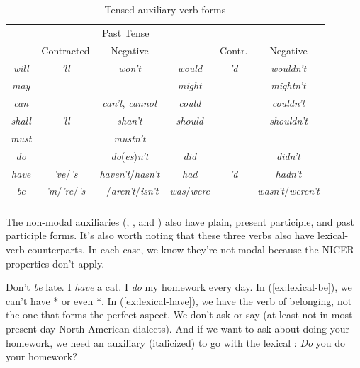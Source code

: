 \begin{table}
    \begin{tabular}{cccccc}
        \lsptoprule
        \multicolumn{3}{c}{Present Tense} & \multicolumn{3}{c}{Past Tense} \\
         & Contracted & Negative &  & Contr. & Negative \\
        \midrule
        \textit{will} & \textit{'ll} & \textit{won't} & \textit{would} & \textit{'d} & \textit{wouldn't} \\ 
        \textit{may} & & & \textit{might} & & \textit{mightn't} \\ 
        \textit{can} & & \textit{can't}, \textit{cannot} & \textit{could} & & \textit{couldn't} \\ 
        \textit{shall} & \textit{'ll} & \textit{shan't} & \textit{should} & & \textit{shouldn't} \\ 
        \textit{must} & & \textit{mustn't} & & & \\
        \textit{do} & &\textit{do}(\textit{es})\textit{n't} & \textit{did} && \textit{didn't} \\ 
        \textit{have} & \textit{'ve}/\textit{'s} & \textit{haven't}/\textit{hasn't} & \textit{had} & \textit{'d} & \textit{hadn't} \\ 
        \textit{be} & \textit{'m}/\textit{'re}/\textit{'s} & \textit{--}/\textit{aren't}/\textit{isn't} & \textit{was}/\textit{were} & & \textit{wasn't}/\textit{weren't} \\
        \lspbottomrule
    \end{tabular}
    \caption{Tensed auxiliary verb forms}
    \label{tab:modal-auxiliary-forms}
\end{table}

\noindent The non-modal auxiliaries (, , and ) also have plain, present participle, and past participle forms. It's also worth noting that these three verbs also have lexical-verb counterparts. In each case, we know they're not modal because the NICER properties don't apply.

\ea
\ea Don't \emph{be} late.\label{ex:lexical-be}
\ex I \emph{have} a cat.\label{ex:lexical-have}
\ex I \emph{do} my homework every day.\label{ex:lexical-do}
\z\z
In (\ref{ex:lexical-be}), we can't have * or even *. In (\ref{ex:lexical-have}), we have the verb of belonging, not the one that forms the perfect aspect. We don't ask  or say  (at least not in most present-day North American dialects). And if we want to ask about doing your homework, we need an auxiliary  (italicized) to go with the lexical : \emph{Do} you do your homework?

